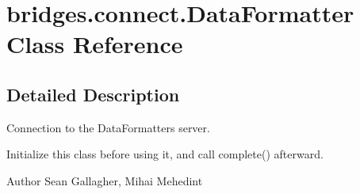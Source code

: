 \hypertarget{classbridges_1_1connect_1_1_data_formatter}{}\section{bridges.\+connect.\+Data\+Formatter Class Reference}
\label{classbridges_1_1connect_1_1_data_formatter}


\subsection{Detailed Description}
Connection to the Data\+Formatters server.

Initialize this class before using it, and call complete() afterward.

\begin{DoxyAuthor}{Author}
Sean Gallagher, Mihai Mehedint 
\end{DoxyAuthor}
